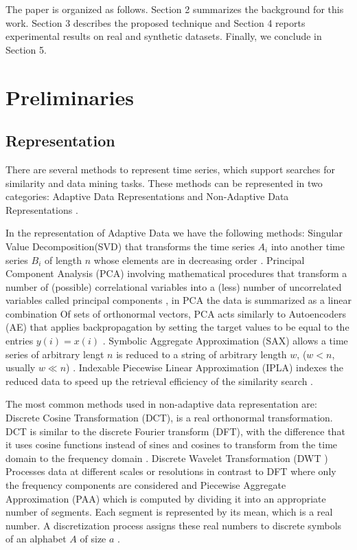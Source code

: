 \documentclass{article}
\begin{document}
 
The paper is organized as follows. Section 2 summarizes the background for this work. Section 3 describes the proposed technique and Section 4 reports experimental results on real and synthetic datasets. Finally, we conclude in Section 5.
 
\section{Preliminaries}

\subsection{Representation}  %
There are several methods to represent time series, which support searches for similarity and data mining tasks. These methods can be represented in two categories: Adaptive Data Representations and Non-Adaptive Data Representations \cite{wang13}.

In the representation of Adaptive Data we have the following methods: Singular Value Decomposition(SVD) that transforms the time series $ A_i $ into another time series $ B_i $ of length $ n $ whose elements are in decreasing order \cite{Bettaiah14}. Principal Component Analysis (PCA) involving mathematical procedures that transform a number of (possible) correlational variables into a (less) number of uncorrelated variables called principal components \cite{wekwek}, in PCA the data is summarized as a linear combination Of sets of orthonormal vectors, PCA acts similarly to Autoencoders (AE) that applies backpropagation by setting the target values to be equal to the entries $ y (i) = x (i) $ \cite{wekwek}. Symbolic Aggregate Approximation (SAX) allows a time series of arbitrary lengt $ n $ is reduced to a string of arbitrary length $ w $, ($ w <n $, usually $ w \ll n $) \cite{Lin07}. Indexable Piecewise Linear Approximation (IPLA) indexes the reduced data to speed up the retrieval efficiency of the similarity search \cite{Chen07}.

The most common methods used in non-adaptive data representation are: Discrete Cosine Transformation (DCT), is a real orthonormal transformation. DCT is similar to the discrete Fourier transform (DFT)\cite{Faloutsos94}, with the difference that it uses cosine functions instead of sines and cosines to transform from the time domain to the frequency domain \cite{Bettaiah14}. Discrete Wavelet Transformation (DWT ) Processes data at different scales or resolutions in contrast to DFT \cite{Faloutsos94} where only the frequency components are considered \cite{Bettaiah14} and Piecewise Aggregate Approximation (PAA) which is computed by dividing it into an appropriate number of segments. Each segment is represented by its mean, which is a real number. A discretization process assigns these real numbers to discrete symbols of an alphabet $ A $ of size $ a $ \cite{Bettaiah14} .
\end{document}

